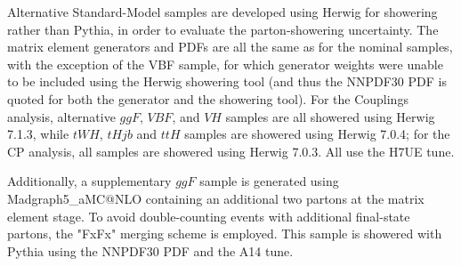 Alternative Standard-Model samples are developed using Herwig for showering rather than Pythia, in order to evaluate the parton-showering uncertainty. The matrix element generators and PDFs are all the same as for the nominal samples, with the exception of the VBF sample, for which generator weights were unable to be included using the Herwig showering tool (and thus the NNPDF30 PDF is quoted for both the generator and the showering tool). For the Couplings analysis, alternative $ggF$, $VBF$, and $VH$ samples are all showered using Herwig 7.1.3, while $tWH$, $tHjb$ and $ttH$ samples are showered using Herwig 7.0.4; for the CP analysis, all samples are showered using Herwig 7.0.3. All use the H7UE tune.

Additionally, a supplementary $ggF$ sample is generated using Madgraph5\_aMC@NLO containing an additional two partons at the matrix element stage. To avoid double-counting events with additional final-state partons, the "FxFx" merging scheme is employed. This sample is showered with Pythia using the NNPDF30 PDF and the A14 tune.
 
\begin{table}[h!]
  \centering
  \caption{Summary of alternative signal samples}
  \label{tab:signal_samples_herwig}
\end{table}  

